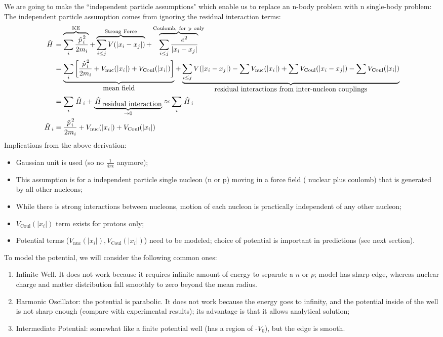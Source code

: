 \documentclass{school-22.101-notes}
\begin{document}
We are going to make the ``independent particle assumptions" which enable us to replace an n-body problem with n single-body problem:
The independent particle assumption comes from ignoring the residual interaction terms: 
\begin{align}
 \left. \hat{H} \right. &= \overbrace{\displaystyle\sum_i \frac{\left. \hat{p} \right.^2_i}{2m_i}}^{\mathrm{KE}} + \overbrace{\displaystyle\sum_{i \le j} V(|x_i - x_j|)}^{\mathrm{Strong \mbox{ } Force}} + \overbrace{\displaystyle\sum_{i \le j} \frac{e^2}{|x_i - x_j|}}^{\mathrm{Coulomb, \mbox{ } for \mbox{ } p \mbox{ } only}} \\
 &= \underbrace{ \displaystyle\sum_i \left[ \frac{\left. \hat{p} \right.^2_i}{2m_i} + V_{\mathrm{nuc}} (|x_i|) + V_{\mathrm{Coul}} (|x_i|)  \right]}_{\mbox{mean field}}  + \underbrace{\displaystyle\sum_{i \le j} V(|x_i - x_j|) - \displaystyle\sum V_{\mathrm{nuc}} (|x_i|) + \displaystyle\sum V_{\mathrm{Coul}} (|x_i - x_j|) - \displaystyle\sum V_{\mathrm{Coul}} (|x_i|) }_{\mbox{residual interactions from inter-nucleon couplings} } \\
 &= \displaystyle\sum_i \left. \hat{H} \right._i + \underbrace{\left. \hat{H} \right._{\mbox{residual interaction}}}_{\to 0} \approx \displaystyle\sum_i \left. \hat{H} \right._i \\
\left. \hat{H} \right._i &= \frac{\left. \hat{p} \right.^2_i}{2m_i} + V_{\mathrm{nuc}} (|x_i|) + V_{\mathrm{Coul}} (|x_i|) 
\end{align}
Implications from the above derivation:
\begin{itemize}
\item Gaussian unit is used (so no $\frac{1}{4 \pi \epsilon}$ anymore); 
\item This assumption is for a independent particle single nucleon (n or p) moving in a force field ( nuclear plus coulomb) that is generated by all other nucleons; 
\item While there is strong interactions between nucleons, motion of each nucleon is practically independent of any other nucleon; 
\item $V_{\mathrm{Coul}} (|x_i|)$ term exists for protons only; 
\item Potential terms ($V_{\mathrm{nuc}} (|x_i|), V_{\mathrm{Coul}} (|x_i|)$) need to be modeled; choice of potential is important in predictions (see next section).
\end{itemize}

To model the potential, we will consider the following common ones: 
\begin{enumerate}
\item Infinite Well. It does not work because it requires infinite amount of energy to separate a $n$ or $p$; model has sharp edge, whereas nuclear charge and matter distribution fall smoothly to zero beyond the mean radius.
\item Harmonic Oscillator: the potential is parabolic. It does not work because the energy goes to infinity, and the potential inside of the well is not sharp enough (compare with experimental results); its advantage is that it allows analytical solution;
\item Intermediate Potential: somewhat like a finite potential well (has a region of -$V_0$), but the edge is smooth. 
\end{enumerate}
\end{document}
